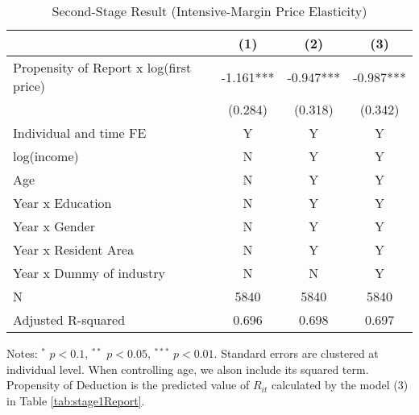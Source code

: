 \documentclass[
  11pt,
  a4paper,
]{article}
\begin{document}
\begin{table}

\caption{\label{tab:IntensiveReport}Second-Stage Result (Intensive-Margin Price Elasticity)}
\centering
\fontsize{7}{9}\selectfont
\begin{threeparttable}
\begin{tabular}[t]{lccc}
\toprule
 & (1) & (2) & (3)\\
\midrule
Propensity of Report x log(first price) & -1.161*** & -0.947*** & -0.987***\\
 & (0.284) & (0.318) & (0.342)\\
Individual and time FE & Y & Y & Y\\
log(income) & N & Y & Y\\
Age & N & Y & Y\\
Year x Education & N & Y & Y\\
Year x Gender & N & Y & Y\\
Year x Resident Area & N & Y & Y\\
Year x Dummy of industry & N & N & Y\\
N & 5840 & 5840 & 5840\\
Adjusted R-squared & 0.696 & 0.698 & 0.697\\
\bottomrule
\end{tabular}
\begin{tablenotes}
\item Notes: $^{*}$ $p < 0.1$, $^{**}$ $p < 0.05$, $^{***}$ $p < 0.01$. Standard errors are clustered at individual level. When controlling age, we alson include its squared term. Propensity of Deduction is the predicted value of $R_{it}$ calculated by the model (3) in Table \ref{tab:stage1Report}.
\end{tablenotes}
\end{threeparttable}
\end{table}
\end{document}
